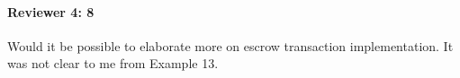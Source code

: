 \documentclass[9pt]{article}
\begin{document}
\begin{multicols*}{2}
\paragraph{Reviewer 4: 8}
\begin{feedback}
  Would it be possible to elaborate more on escrow transaction implementation.
  It was not clear to me from Example 13.
\end{feedback}



\end{multicols*}
\end{document}
